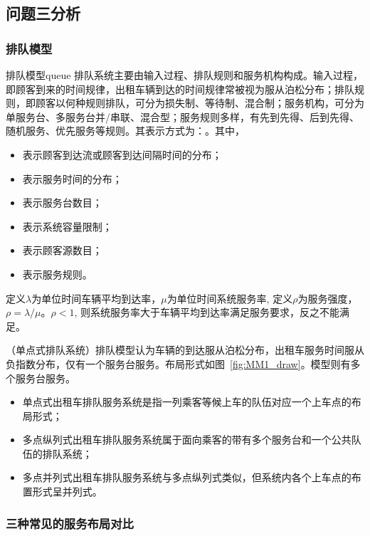\subsection{问题三分析}
\subsubsection{排队模型}
\begin{defnbox}{排队模型}{queue}
    排队系统主要由输入过程、排队规则和服务机构构成。输入过程，即顾客到来的时间规律，出租车辆到达的时间规律常被视为服从泊松分布；排队规则，即顾客以何种规则排队，可分为损失制、等待制、混合制；服务机构，可分为单服务台、多服务台并/串联、混合型；服务规则多样，有先到先得、后到先得、随机服务、优先服务等规则。其表示方式为：。其中，
    \begin{itemize}
        \item {}表示顾客到达流或顾客到达间隔时间的分布；
        \item {}表示服务时间的分布；
        \item {}表示服务台数目；
        \item {}表示系统容量限制；
        \item {}表示顾客源数目；
        \item {}表示服务规则。
    \end{itemize}
\end{defnbox}

定义$\lambda$为单位时间车辆平均到达率，$\mu$为单位时间系统服务率, 定义$\rho$为服务强度，$\rho=\lambda/\mu$。$\rho<1$, 则系统服务率大于车辆平均到达率满足服务要求，反之不能满足。

（单点式排队系统）排队模型认为车辆的到达服从泊松分布，出租车服务时间服从负指数分布，仅有一个服务台服务。布局形式如图~\ref{fig:MM1_draw}。模型则有多个服务台服务。

\begin{itemize}
    \item 单点式出租车排队服务系统是指一列乘客等候上车的队伍对应一个上车点的布局形式；
    \item 多点纵列式出租车排队服务系统属于面向乘客的带有多个服务台和一个公共队伍的排队系统；
    \item 多点并列式出租车排队服务系统与多点纵列式类似，但系统内各个上车点的布置形式呈并列式。
\end{itemize}

\subsubsection{三种常见的服务布局对比}

